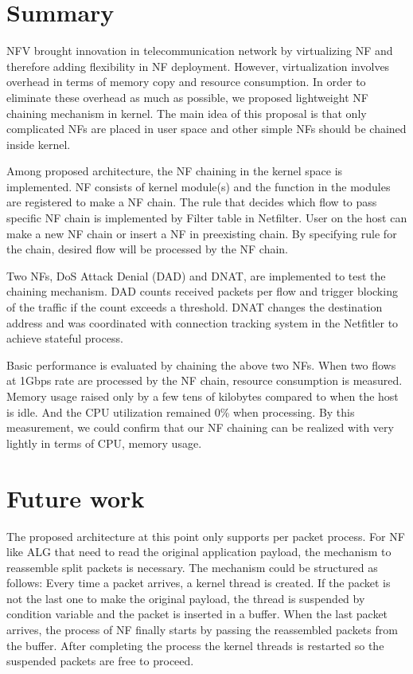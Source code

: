 \section{Summary}
NFV brought innovation in telecommunication network by virtualizing NF and therefore adding flexibility in NF deployment. However, virtualization involves overhead in terms of memory copy and resource consumption. In order to eliminate these overhead as much as possible, we proposed lightweight NF chaining mechanism in kernel. The main idea of this proposal is that only complicated NFs are placed in user space and other simple NFs should be chained inside kernel. 

Among proposed architecture, the NF chaining in the kernel space is implemented. NF consists of kernel module(s) and the function in the modules are registered to make a NF chain. The rule that decides which flow to pass specific NF chain is implemented by Filter table in Netfilter. User on the host can make a new NF chain or insert a NF in preexisting chain. By specifying rule for the chain, desired flow will be processed by the NF chain. 

Two NFs, DoS Attack Denial (DAD) and DNAT, are implemented to test the chaining mechanism. DAD counts received packets per flow and trigger blocking of the traffic if the count exceeds a threshold. DNAT changes the destination address and was coordinated with connection tracking system in the Netfitler to achieve stateful process. 

Basic performance is evaluated by chaining the above two NFs. When two flows at 1Gbps rate are processed by the NF chain, resource consumption is measured. Memory usage raised only by a few tens of kilobytes compared to when the host is idle. And the CPU utilization remained 0\% when processing. By this measurement, we could confirm that our NF chaining can be realized with very lightly in terms of CPU, memory usage. 

\section{Future work}
The proposed architecture at this point only supports per packet process. For NF like ALG that need to read the original application payload, the mechanism to reassemble split packets is necessary. The mechanism could be structured as follows: Every time a packet arrives, a kernel thread is created. If the packet is not the last one to make the original payload, the thread is suspended by condition variable and the packet is inserted in a buffer. When the last packet arrives, the process of NF finally starts by passing the reassembled packets from the buffer. After completing the process the kernel threads is restarted so the suspended packets are free to proceed. 